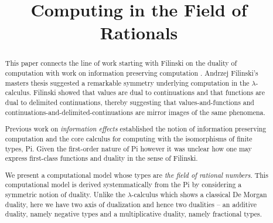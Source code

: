 \documentclass[preprint]{sigplanconf}
\newcommand{\lcal}{\ensuremath{\lambda}-calculus\xspace}
\begin{document}
\CopyrightYear{}
\copyrightdata{}
\titlebanner{}
\preprintfooter{}

\title{Computing in the Field of Rationals}



\maketitle

\begin{abstract}

  This paper connects the line of work starting with
  Filinski\cite{Filinski:1989:DCI:648332.755574} on the duality of
  computation \cite{Curien:2000,DBLP:conf/rta/Wadler05} with work on
  information preserving computation \cite{infeffects,rc2011}.
  Andrzej Filinski's masters thesis
  \cite{Filinski:1989:DCI:648332.755574} suggested a remarkable
  symmetry underlying computation in the \lcal. Filinski showed that
  values are dual to continuations and that functions are dual to
  delimited continuations, thereby suggesting that
  values-and-functions and continuations-and-delimited-continuations
  are mirror images of the same phenomena.

  Previous work on \emph{information effects} established the notion
  of information preserving computation \cite{infeffects} and the core
  calculus for computing with the isomorphisms of finite types,
  {{Pi}}. Given the first-order nature of {{Pi}} however it was
  unclear how one may express first-class functions and duality in the
  sense of Filinski.

  We present a computational model whose types are \emph{the field of
    rational numbers}. This computational model is derived
  systemmatically from the {{Pi}} by considering a symmetric notion of
  duality. Unlike the \lcal which shows a classical De Morgan duality,
  here we have two axis of dualization and hence two dualities -- an
  additive duality, namely negative types and a multiplicative
  duality, namely fractional types.


\end{abstract}
\end{document}
